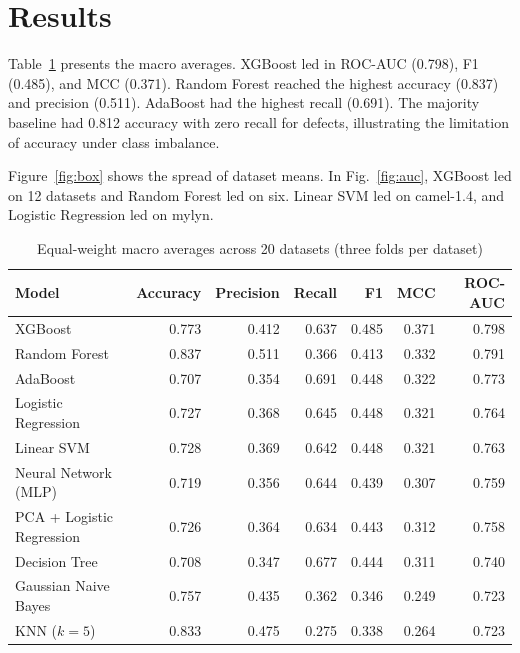 \documentclass[conference]{IEEEtran}
\begin{document}
\section{Results}
Table~\ref{tab:results} presents the macro averages. XGBoost led in ROC-AUC (0.798), F1 (0.485), and MCC (0.371). Random Forest reached the highest accuracy (0.837) and precision (0.511). AdaBoost had the highest recall (0.691). The majority baseline had 0.812 accuracy with zero recall for defects, illustrating the limitation of accuracy under class imbalance.

Figure~\ref{fig:box} shows the spread of dataset means. In Fig.~\ref{fig:auc}, XGBoost led on 12 datasets and Random Forest led on six. Linear SVM led on camel-1.4, and Logistic Regression led on mylyn.
\begin{table}[t]
\caption{Equal-weight macro averages across 20 datasets (three folds per dataset)}
\label{tab:results}\centering\footnotesize
\begin{tabular}{lrrrrrr}\toprule
Model & Accuracy & Precision & Recall & F1 & MCC & ROC-AUC\\\midrule
XGBoost & 0.773 & 0.412 & 0.637 & 0.485 & 0.371 & 0.798\\
Random Forest & 0.837 & 0.511 & 0.366 & 0.413 & 0.332 & 0.791\\
AdaBoost & 0.707 & 0.354 & 0.691 & 0.448 & 0.322 & 0.773\\
Logistic Regression & 0.727 & 0.368 & 0.645 & 0.448 & 0.321 & 0.764\\
Linear SVM & 0.728 & 0.369 & 0.642 & 0.448 & 0.321 & 0.763\\
Neural Network (MLP) & 0.719 & 0.356 & 0.644 & 0.439 & 0.307 & 0.759\\
PCA + Logistic Regression & 0.726 & 0.364 & 0.634 & 0.443 & 0.312 & 0.758\\
Decision Tree & 0.708 & 0.347 & 0.677 & 0.444 & 0.311 & 0.740\\
Gaussian Naive Bayes & 0.757 & 0.435 & 0.362 & 0.346 & 0.249 & 0.723\\
KNN ($k=5$) & 0.833 & 0.475 & 0.275 & 0.338 & 0.264 & 0.723\\\bottomrule
\end{tabular}
\end{table}
\end{document}
